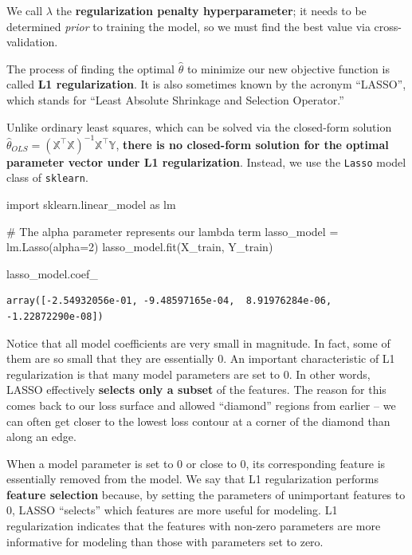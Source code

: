 \documentclass[
  letterpaper,
  DIV=11,
  numbers=noendperiod]{scrreprt}
\newenvironment{Shaded}{\begin{snugshade}}{\end{snugshade}}
\newcommand{\CommentTok}[1]{\textcolor[rgb]{0.37,0.37,0.37}{#1}}
\newcommand{\DecValTok}[1]{\textcolor[rgb]{0.68,0.00,0.00}{#1}}
\newcommand{\ImportTok}[1]{\textcolor[rgb]{0.00,0.46,0.62}{#1}}
\newcommand{\NormalTok}[1]{\textcolor[rgb]{0.00,0.23,0.31}{#1}}
\newcommand{\OperatorTok}[1]{\textcolor[rgb]{0.37,0.37,0.37}{#1}}
\begin{document}
We call \(\lambda\) the \textbf{regularization penalty hyperparameter};
it needs to be determined \emph{prior} to training the model, so we must
find the best value via cross-validation.

The process of finding the optimal \(\hat{\theta}\) to minimize our new
objective function is called \textbf{L1 regularization}. It is also
sometimes known by the acronym ``LASSO'', which stands for ``Least
Absolute Shrinkage and Selection Operator.''

Unlike ordinary least squares, which can be solved via the closed-form
solution
\(\hat{\theta}_{OLS} = (\mathbb{X}^{\top}\mathbb{X})^{-1}\mathbb{X}^{\top}\mathbb{Y}\),
\textbf{there is no closed-form solution for the optimal parameter
vector under L1 regularization}. Instead, we use the \texttt{Lasso}
model class of \texttt{sklearn}.

\begin{Shaded}
\begin{Highlighting}[]
\ImportTok{import}\NormalTok{ sklearn.linear\_model }\ImportTok{as}\NormalTok{ lm}

\CommentTok{\# The alpha parameter represents our lambda term}
\NormalTok{lasso\_model }\OperatorTok{=}\NormalTok{ lm.Lasso(alpha}\OperatorTok{=}\DecValTok{2}\NormalTok{)}
\NormalTok{lasso\_model.fit(X\_train, Y\_train)}

\NormalTok{lasso\_model.coef\_}
\end{Highlighting}
\end{Shaded}

\begin{verbatim}
array([-2.54932056e-01, -9.48597165e-04,  8.91976284e-06, -1.22872290e-08])
\end{verbatim}

Notice that all model coefficients are very small in magnitude. In fact,
some of them are so small that they are essentially 0. An important
characteristic of L1 regularization is that many model parameters are
set to 0. In other words, LASSO effectively \textbf{selects only a
subset} of the features. The reason for this comes back to our loss
surface and allowed ``diamond'' regions from earlier -- we can often get
closer to the lowest loss contour at a corner of the diamond than along
an edge.

When a model parameter is set to 0 or close to 0, its corresponding
feature is essentially removed from the model. We say that L1
regularization performs \textbf{feature selection} because, by setting
the parameters of unimportant features to 0, LASSO ``selects'' which
features are more useful for modeling. L1 regularization indicates that
the features with non-zero parameters are more informative for modeling
than those with parameters set to zero.
\end{document}
